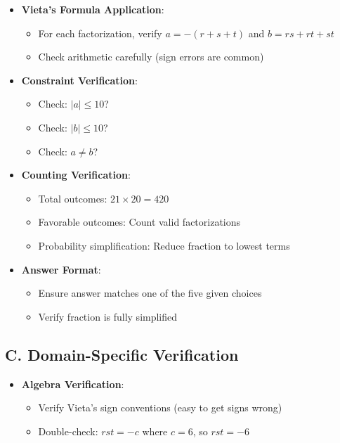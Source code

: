 \documentclass[12pt]{article}
\begin{document}
\begin{verificationbox}
\begin{itemize}[leftmargin=*]
    \item \textbf{Vieta's Formula Application}:
    \begin{itemize}
        \item For each factorization, verify $a = -(r+s+t)$ and $b = rs + rt + st$
        \item Check arithmetic carefully (sign errors are common)
    \end{itemize}
    
    \item \textbf{Constraint Verification}:
    \begin{itemize}
        \item Check: $|a| \leq 10$? 
        \item Check: $|b| \leq 10$?
        \item Check: $a \neq b$?
    \end{itemize}
    
    \item \textbf{Counting Verification}:
    \begin{itemize}
        \item Total outcomes: $21 \times 20 = 420$ \checkmark
        \item Favorable outcomes: Count valid factorizations
        \item Probability simplification: Reduce fraction to lowest terms
    \end{itemize}
    
    \item \textbf{Answer Format}:
    \begin{itemize}
        \item Ensure answer matches one of the five given choices
        \item Verify fraction is fully simplified
    \end{itemize}
\end{itemize}

\subsection*{C. Domain-Specific Verification}
\begin{itemize}[leftmargin=*]
    \item \textbf{Algebra Verification}:
    \begin{itemize}
        \item Verify Vieta's sign conventions (easy to get signs wrong)
        \item Double-check: $rst = -c$ where $c = 6$, so $rst = -6$
    \end{itemize}
    

\end{itemize}
\end{verificationbox}
\end{document}
